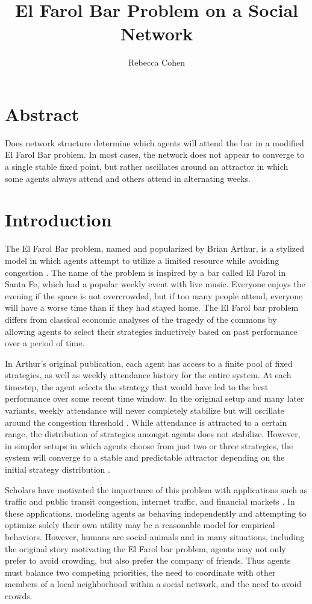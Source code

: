 \documentclass[12pt]{article}
\title{El Farol Bar Problem on a Social Network}
\author{Rebecca Cohen}
\begin{document}
\maketitle
\section{Abstract}
Does network structure determine which agents will attend the bar in a modified El Farol Bar problem.  In most cases, the network does not appear to converge to a single stable fixed point, but rather oscillates around an attractor in which some agents always attend and others attend in alternating weeks.  

\section{Introduction}

The El Farol Bar problem, named and popularized by Brian Arthur, is a stylized model in which agents attempt to utilize a limited resource while avoiding congestion \cite{arthur:1994}.  The name of the problem is inspired by a bar called El Farol in Santa Fe, which had a popular weekly event with live music.  Everyone enjoys the evening if the space is not overcrowded, but if too many people attend, everyone will have a worse time than if they had stayed home.  The El Farol bar problem differs from classical economic analyses of the tragedy of the commons by allowing agents to select their strategies inductively based on past performance over a period of time.

In Arthur's original publication, each agent has access to a finite pool of fixed strategies, as well as weekly attendance history for the entire system.  At each timestep, the agent selects the strategy that would have led to the best performance over some recent time window.  In the original setup and many later variants, weekly attendance will never completely stabilize but will oscillate around the congestion threshold \cite{arthur:1994} \cite{chen:2012} \cite{zambrano:2004}.  While attendance is attracted to a certain range, the distribution of strategies amongst agents does not stabilize.  However, in simpler setups in which agents choose from just two or three strategies, the system will converge to a stable and predictable attractor depending on the initial strategy distribution \cite{stLuce:2020}.

Scholars have motivated the importance of this problem with applications such as traffic and public transit congestion, internet traffic, and financial markets \cite{zambrano:2004} \cite{chen:2012}.  In these applications, modeling agents as behaving independently and attempting to optimize solely their own utility may be a reasonable model for empirical behaviors.  However, humans are social animals and in many situations, including the original story motivating the El Farol bar problem, agents may not only prefer to avoid crowding, but also prefer the company of friends.  Thus agents must balance two competing priorities, the need to coordinate with other members of a local neighborhood within a social network, and the need to avoid crowds.
\end{document}
